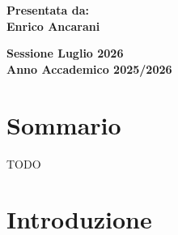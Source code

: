 \documentclass[12pt,a4paper,twoside]{report}
\begin{document}
\begin{titlepage}
\begin{minipage}[t]{0.50\textwidth}
		\end{minipage}
		\hfill
		\begin{minipage}[t]{0.47\textwidth}\raggedleft
			{\large{\bf Presentata da:\\
					Enrico Ancarani}}
		\end{minipage}
		
		\vspace{10mm}
		\begin{center}
			{\large{\bf Sessione Luglio 2026 \\}}
			{\large{\bf Anno Accademico 2025/2026\\}}
		\end{center}
	\end{titlepage}
	\clearpage{\pagestyle{empty}\cleardoublepage}
	\cleardoublepage
	\tableofcontents
	\clearpage{\pagestyle{empty}\cleardoublepage}
	
	\chapter*{Sommario}
	\thispagestyle{plain}
	TODO
	\chapter{Introduzione}     
	\vspace{-0.5cm}        
\end{document}
